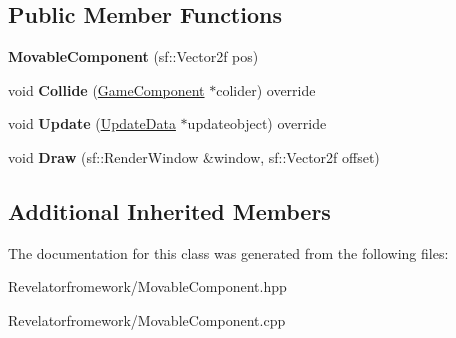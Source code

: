 \subsection*{Public Member Functions}
\begin{DoxyCompactItemize}
\item 
\hypertarget{class_movable_component_aea0453392e1d269a4b4c207728a3ddaf}{{\bfseries Movable\-Component} (sf\-::\-Vector2f pos)}\label{class_movable_component_aea0453392e1d269a4b4c207728a3ddaf}

\item 
\hypertarget{class_movable_component_a5ab32fd53c29a29ddcd68f1bb38a5f2b}{void {\bfseries Collide} (\hyperlink{class_game_component}{Game\-Component} $\ast$colider) override}\label{class_movable_component_a5ab32fd53c29a29ddcd68f1bb38a5f2b}

\item 
\hypertarget{class_movable_component_a6310c2306c503472873721a9756003a8}{void {\bfseries Update} (\hyperlink{class_update_data}{Update\-Data} $\ast$updateobject) override}\label{class_movable_component_a6310c2306c503472873721a9756003a8}

\item 
\hypertarget{class_movable_component_a75c4dad8db642791c52d7fc5e9a92429}{void {\bfseries Draw} (sf\-::\-Render\-Window \&window, sf\-::\-Vector2f offset)}\label{class_movable_component_a75c4dad8db642791c52d7fc5e9a92429}

\end{DoxyCompactItemize}
\subsection*{Additional Inherited Members}


The documentation for this class was generated from the following files\-:\begin{DoxyCompactItemize}
\item 
Revelatorfromework/Movable\-Component.\-hpp\item 
Revelatorfromework/Movable\-Component.\-cpp\end{DoxyCompactItemize}
